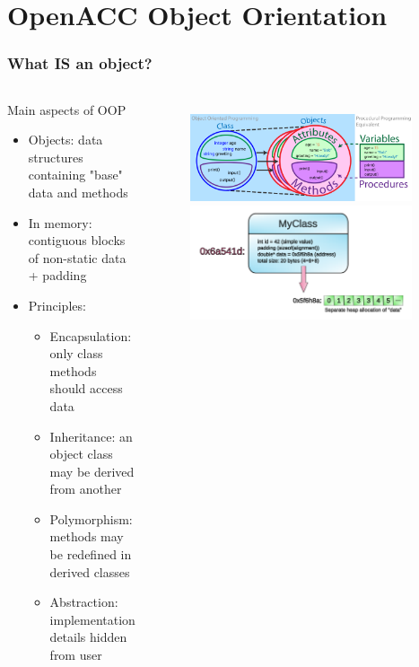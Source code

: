 \section{OpenACC Object Orientation}

\begin{frame}
	\frametitle{What IS an object?}
    \begin{columns}
            \begin{block}{Main aspects of OOP}
                \begin{itemize}
                    \item Objects: data structures containing "base" data and methods
                    \item In memory: contiguous blocks of non-static data + padding
                    \item Principles:
                    \begin{itemize}
                        \item Encapsulation: only class methods should access data
                        \item Inheritance: an object class may be derived from another
                        \item Polymorphism: methods may be redefined in derived classes
                        \item Abstraction: implementation details hidden from user
                    \end{itemize}
                \end{itemize}
            \end{block}
        \begin{figure}
            \centering
            \includegraphics[width=0.95\textwidth]{images/oop.png}
            \includegraphics[width=0.95\textwidth]{images/objInMemory.pdf}
        \end{figure}
    \end{columns}
\end{frame}

